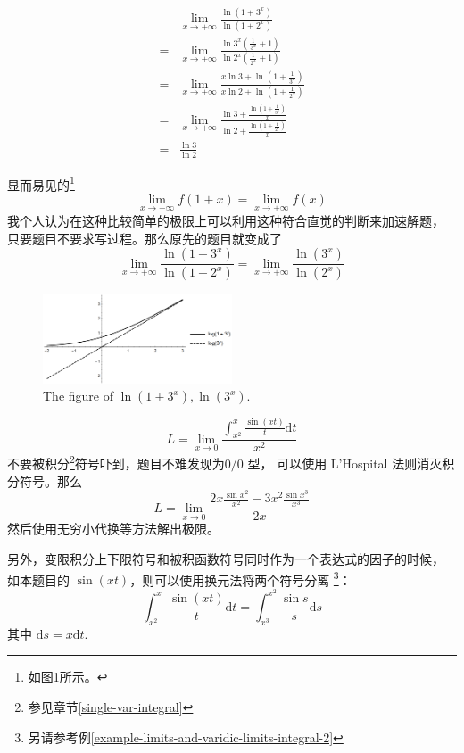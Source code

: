 \begin{example}
    \begin{align*}
         &\lim_{x \to + \infty} \frac{\ln (1+3^x)}{\ln (1+2^x)}\\
        =&\lim_{x \to + \infty} \frac{\ln 3^x \left(\frac{1}{3^x} + 1\right)}{\ln 2^x \left(\frac{1}{2^x} + 1\right)}\\
        =&\lim_{x \to + \infty} 
        \frac{
            x\ln 3 + \ln \left(1+\frac{1}{3^x}\right)
        }{
            x\ln 2 + \ln \left(1+\frac{1}{2^x}\right)
        }\\
        =&\lim_{x \to + \infty} 
        \frac{
            \ln 3 + \frac{\ln \left(1+\frac{1}{3^x}\right)}{x}
        }{
            \ln 2 + \frac{\ln \left(1+\frac{1}{2^x}\right)}{x}
        }\\
        =&\frac{\ln 3}{\ln 2}
    \end{align*}

    显而易见的\footnote{如图\ref{fig:ln-1-plus-3-to-x-and-its-sibling}所示。}
    \[
        \lim_{x \to +\infty} f(1 + x) = \lim_{x \to +\infty} f(x)
    \]
    我个人认为在这种比较简单的极限上可以利用这种符合直觉的判断来加速解题，
    只要题目不要求写过程。那么原先的题目就变成了
    \[
         \lim_{x \to + \infty} \frac{\ln (1+3^x)}{\ln (1+2^x)} = 
         \lim_{x \to + \infty} \frac{\ln (3^x)}{\ln (2^x)}
    \]
\end{example}

\begin{figure}
    \centering
    \includegraphics[width=0.5\textwidth]{figure/ln(1plus3tox)-ln(3tox).png}
    \caption{The figure of $\ln(1+3^x), \ln(3^x)$.}
    \label{fig:ln-1-plus-3-to-x-and-its-sibling}
\end{figure}

\begin{example}
    \label{example-limits-and-varidic-limits-integral-1}
    \[
        L = \lim_{x \to 0} 
        \frac{\int_{x^2}^{x} \frac{\sin (xt)}{t} \mathrm dt }{x^2}
    \]
    不要被积分\footnote{参见章节\ref{single-var-integral}}符号吓到，题目不难发现为$0/0$ 型，
    可以使用 L'Hospital 法则消灭积分符号。那么
    \[
        L = \lim_{x \to 0} \frac{2x \frac{\sin x^2}{x^2} - 3x^2 \frac{\sin x^3}{x^3}}{2x}
    \]
    然后使用无穷小代换等方法解出极限。

    另外，变限积分上下限符号和被积函数符号同时作为一个表达式的因子的时候，
    如本题目的 $\sin (xt)$，则可以使用换元法将两个符号分离
    \footnote{另请参考例\ref{example-limits-and-varidic-limits-integral-2}}：
    \[
        \int_{x^2}^{x}   \frac{\sin (xt)}{t}\mathrm dt  = 
        \int_{x^3}^{x^2} \frac{\sin s}{s}   \mathrm ds
    \]
    其中 $\mathrm ds = x \mathrm dt$.
\end{example}

